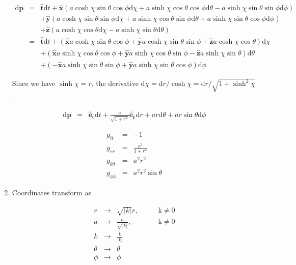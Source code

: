 \documentclass[12pt,a4paper]{article}
\begin{document}
\begin{enumerate}
\begin{eqnarray*}
	\mathrm d\bm{p} &=& \bm{\hat t} \mathrm d t + \bm{\hat x} ( a \cosh \chi \sin\theta \cos\phi \mathrm d \chi + a \sinh\chi \cos\theta \cos\phi \mathrm d\theta - a \sinh \chi \sin\theta\sin\phi \mathrm d \phi  )  \\
	&&  + \bm{\hat y} ( a\cosh\chi \sin\theta\sin\phi\mathrm d\chi + a\sinh\chi \cos\theta\sin\phi \mathrm d\theta  + a\sinh\chi \sin\theta \cos\phi \mathrm d \phi ) \\
	&& + \bm{\hat z} ( a\cosh\chi \cos\theta\mathrm d\chi  - a\sinh\chi \sin\theta\mathrm d\theta ) \\
	&=& \bm{\hat t} \mathrm dt + ( \bm{\hat x} a \cosh\chi\sin\theta \cos\phi + \bm{\hat y}a\cosh\chi \sin\theta\sin\phi + \bm{\hat z} a\cosh\chi\cos\theta )\mathrm d\chi \\
	&& + ( \bm{\hat x} a\sinh\chi\cos\theta\cos\phi + \bm{\hat y}a\sinh\chi\cos\theta\sin\phi - \bm{\hat z}a\sinh\chi\sin\theta )\mathrm d\theta \\
	&& + ( -\bm{\hat x} a \sinh\chi \sin\theta\sin\phi + \bm{\hat y} a\sinh\chi \sin\theta\cos\phi )\mathrm d\phi
\end{eqnarray*}

Since we have $\sinh\chi = r$, the derivative $\mathrm d\chi = \mathrm dr/\cosh\chi=\mathrm d r /\sqrt{1+\sinh^2\chi}$.

\begin{eqnarray*}
	\mathrm d\bm p &=& \bm{\hat e_t}\mathrm dt + \frac{a}{\sqrt{1+r^2}} \bm{\hat e_r} \mathrm dr + a r \mathrm d\theta + a r \sin\theta \mathrm d\phi
\end{eqnarray*}


\begin{eqnarray*}
	g_{tt} &=& -1 \\
	g_{rr} &=& \frac{a^2 }{1 + r^2} \\
	g_{\theta\theta} &=& a^2 r^2 \\
	g_{\phi\phi} &=& a^2 r^2 \sin\theta
\end{eqnarray*}



\item


Coordinates transform as

\begin{equation*}
\begin{array}{llll}
	r & \rightarrow &  \sqrt{\vert k \vert} r ,   \qquad   &\mathrm{k \neq 0} \\
	a &\rightarrow& \frac{a}{\sqrt{\vert k\vert} },   \qquad & \mathrm{k \neq 0} \\
	k &\rightarrow & \frac{k}{\vert k \vert} & \\
	\theta &\rightarrow & \theta  & \\
	\phi &\rightarrow & \phi & 
\end{array}
\end{equation*}








\end{enumerate}
\end{document}
